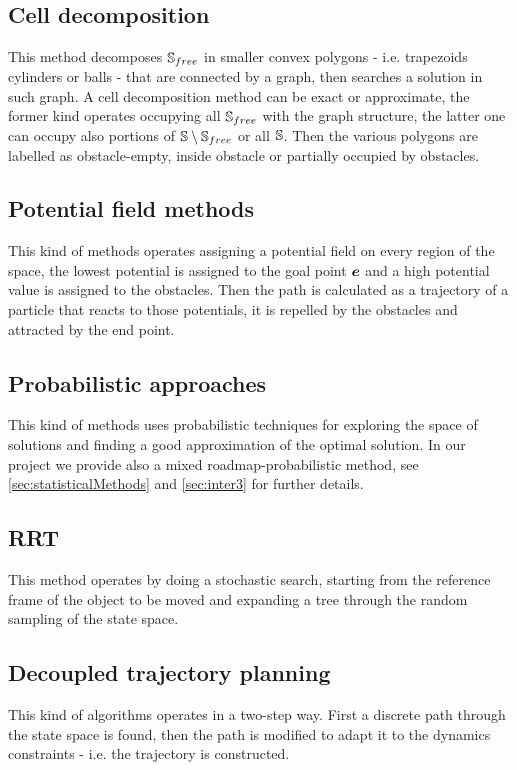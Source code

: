 \documentclass[dissertation.tex]{subfiles}
\begin{document}
\subsection{Cell decomposition}
This method decomposes $\mathbb{S}_{free}$ in smaller convex polygons - i.e.
trapezoids cylinders or balls - that
are connected by a graph, then searches a solution in such graph. A cell
decomposition method can be exact
or approximate, the former kind operates occupying all
$\mathbb{S}_{free}$ with the graph structure, the latter one can occupy also
portions of
$\mathbb{S}\setminus\mathbb{S}_{free}$ or all $\mathbb{S}$. Then the various polygons are
labelled as obstacle-empty, inside obstacle or partially occupied by
obstacles.

\subsection{Potential field methods}
This kind of methods operates assigning a potential field on every
region of the space, the lowest potential is assigned to the goal
point $\boldsymbol{e}$ and a high potential value is assigned to the
obstacles. Then the path is calculated as a trajectory of a particle that
reacts to those potentials, it is repelled by the obstacles and
attracted by the end point.

\subsection{Probabilistic approaches}
This kind of methods uses probabilistic techniques for exploring the
space of solutions and finding a good approximation of the optimal
solution. In our project we provide also a mixed
roadmap-probabilistic method, see \cref{sec:statisticalMethods} and
\cref{sec:inter3} for further details.

\subsection{\acf{RRT}}
This method operates by doing a stochastic search, starting from the
reference frame of the object to be moved and expanding a tree through the
random sampling of the state space.

\subsection{Decoupled trajectory planning}
This kind of algorithms operates in a two-step way. First a
discrete path through the state space is found, then the path is
modified to 
adapt it to the dynamics constraints - i.e. the trajectory is constructed.
\end{document}
